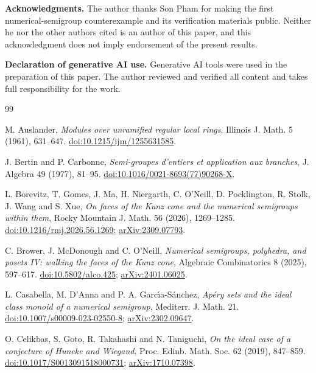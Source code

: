\documentclass[11pt]{article}
\theoremstyle{definition}
\theoremstyle{remark}
\begin{document}
\medskip
\noindent\textbf{Acknowledgments.} The author thanks Son Pham for making the first numerical-semigroup counterexample and its verification materials public. Neither he nor the other authors cited is an author of this paper, and this acknowledgment does not imply endorsement of the present results.

\medskip
\noindent\textbf{Declaration of generative AI use.} Generative AI tools were used in the
preparation of this paper. The author reviewed and verified all content and takes full
responsibility for the work.

{\footnotesize\raggedright
\begin{thebibliography}{99}
\setlength{\itemsep}{0.25em}
\setlength{\parsep}{0pt}

M. Auslander,
\emph{Modules over unramified regular local rings},
Illinois J. Math. 5 (1961), 631--647.
\href{https://doi.org/10.1215/ijm/1255631585}{doi:10.1215/ijm/1255631585}.

J. Bertin and P. Carbonne,
\emph{Semi-groupes d'entiers et application aux branches},
J. Algebra 49 (1977), 81--95.
\href{https://doi.org/10.1016/0021-8693(77)90268-X}{doi:10.1016/0021-8693(77)90268-X}.

L. Borevitz, T. Gomes, J. Ma, H. Niergarth, C. O'Neill, D. Pocklington, R. Stolk, J. Wang and S. Xue,
\emph{On faces of the Kunz cone and the numerical semigroups within them},
Rocky Mountain J. Math. 56 (2026), 1269--1285.
\href{https://doi.org/10.1216/rmj.2026.56.1269}{doi:10.1216/rmj.2026.56.1269};
\href{https://arxiv.org/abs/2309.07793}{arXiv:2309.07793}.

C. Brower, J. McDonough and C. O'Neill,
\emph{Numerical semigroups, polyhedra, and posets IV: walking the faces of the Kunz cone},
Algebraic Combinatorics 8 (2025), 597--617.
\href{https://doi.org/10.5802/alco.425}{doi:10.5802/alco.425};
\href{https://arxiv.org/abs/2401.06025}{arXiv:2401.06025}.

L. Casabella, M. D'Anna and P. A. Garc\'{\i}a-S\'anchez,
\emph{Ap\'ery sets and the ideal class monoid of a numerical semigroup},
Mediterr. J. Math. 21.
\href{https://doi.org/10.1007/s00009-023-02550-8}{doi:10.1007/s00009-023-02550-8};
\href{https://arxiv.org/abs/2302.09647}{arXiv:2302.09647}.

O. Celikbas, S. Goto, R. Takahashi and N. Taniguchi,
\emph{On the ideal case of a conjecture of Huneke and Wiegand},
Proc. Edinb. Math. Soc. 62 (2019), 847--859.
\href{https://doi.org/10.1017/S0013091518000731}{doi:10.1017/S0013091518000731};
\href{https://arxiv.org/abs/1710.07398}{arXiv:1710.07398}.


\end{thebibliography}}
\end{document}
